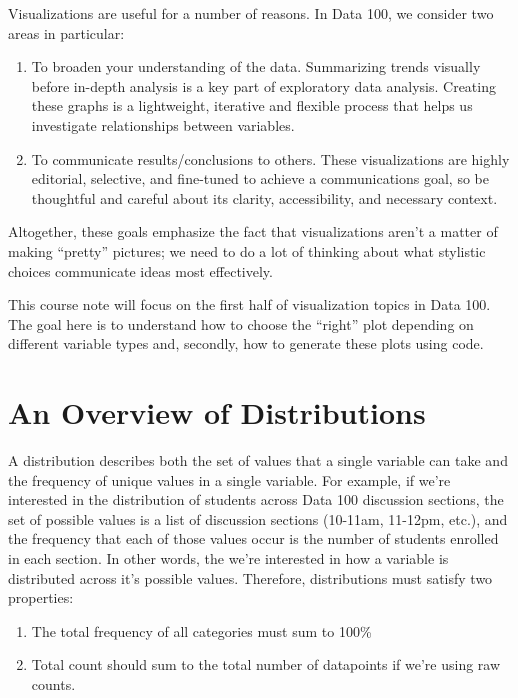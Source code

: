 \documentclass[
  letterpaper,
  DIV=11,
  numbers=noendperiod]{scrreprt}
\providecommand{\tightlist}{%
  \setlength{\itemsep}{0pt}\setlength{\parskip}{0pt}}\usepackage{longtable,booktabs,array}
\begin{document}
Visualizations are useful for a number of reasons. In Data 100, we
consider two areas in particular:

\begin{enumerate}
\def\labelenumi{\arabic{enumi}.}
\tightlist
\item
  To broaden your understanding of the data. Summarizing trends visually
  before in-depth analysis is a key part of exploratory data analysis.
  Creating these graphs is a lightweight, iterative and flexible process
  that helps us investigate relationships between variables.
\item
  To communicate results/conclusions to others. These visualizations are
  highly editorial, selective, and fine-tuned to achieve a
  communications goal, so be thoughtful and careful about its clarity,
  accessibility, and necessary context.
\end{enumerate}

Altogether, these goals emphasize the fact that visualizations aren't a
matter of making ``pretty'' pictures; we need to do a lot of thinking
about what stylistic choices communicate ideas most effectively.

This course note will focus on the first half of visualization topics in
Data 100. The goal here is to understand how to choose the ``right''
plot depending on different variable types and, secondly, how to
generate these plots using code.

\section{An Overview of
Distributions}\label{an-overview-of-distributions}

A distribution describes both the set of values that a single variable
can take and the frequency of unique values in a single variable. For
example, if we're interested in the distribution of students across Data
100 discussion sections, the set of possible values is a list of
discussion sections (10-11am, 11-12pm, etc.), and the frequency that
each of those values occur is the number of students enrolled in each
section. In other words, the we're interested in how a variable is
distributed across it's possible values. Therefore, distributions must
satisfy two properties:

\begin{enumerate}
\def\labelenumi{\arabic{enumi}.}
\tightlist
\item
  The total frequency of all categories must sum to 100\%
\item
  Total count should sum to the total number of datapoints if we're
  using raw counts.
\end{enumerate}
\end{document}
